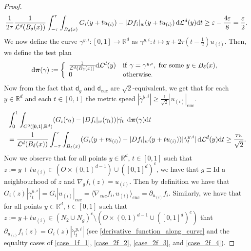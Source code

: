 \documentclass[a4paper,10pt]{article}
\numberwithin{equation}{section}
\newcommand{\R}{\mathbb{R}}
\newcommand{\e}{\varepsilon}
\newcommand{\sfd}{\mathsf d}
\newcommand{\di}{{\rm d}}
\begin{document}
\begin{proof}
    \begin{align}
    \frac{1}{2\tau} \frac{1}{\mathcal{L}^d(B_\delta(x))} \int_{-\tau}^\tau \int_{B_\delta(x)} G_i(y+tu_{(i)})-|Df_i|_w(y+tu_{(i)})\,\di\mathcal{L}^d(y) \di t\geq \e - \frac{4\e}{8} = \frac{\e}{2}.
    \end{align}
    We now define the curve $\gamma^{y, i}:[0,1] \to \R^d$ as $\gamma^{y, i}: t \mapsto y + 2\tau(t- \frac{1}{2})u_{(i)}$. 
    Then, we define the test plan
    \begin{align}
    \di\boldsymbol{\pi}(\gamma):= \left\{ \begin{array}{ll}
           \frac{1}{\mathcal{L}^d(B_\delta(x))}\di\mathcal{L}^d(y) & \mathrm{if}\ \gamma = \gamma^{y, i}, \ \mathrm{for \ some} \ y \in  B_\delta(x), \\
           0\  & \mathrm{otherwise}.
        \end{array}\right.
    \end{align}
    Now from the fact that $\sfd_g$ and $\sfd_{euc}$ are $\sqrt{2}$-equivalent, we get that for each $y \in \R^d$ and each $t \in [0,1]$ the metric speed $|\dot{\gamma}^{y, i}| \geq \frac{1}{\sqrt{2}}|u_{(i)}|_{euc}$.  
\begin{align}\label{evaluation_test_plan_comparison}
&\int_0^1 \int_{C^0([0,1], \R^d)} (G_i(\gamma_t)-|Df_i|_w(\gamma_t))|\dot{\gamma_t}|\,\di \boldsymbol{\pi}(\gamma) \di t\nonumber \\
    &= \frac{1}{\mathcal{L}^d(B_\delta(x))} \int_{-\tau}^\tau \int_{B_\delta(x)} (G_i(y+tu_{(i)})-|Df_i|_w(y+tu_{(i)}))|\dot{\gamma}^{y,i}_t|\,\di\mathcal{L}^d(y) \di t \geq \frac{\tau\e}{\sqrt{2}}.
    \end{align}
Now we observe that for all points $y \in \R^d$, $t \in [0,1]$ such that $z:= y+tu_{(i)} \in (O \times (0,1)^{d-1}) \cup ([0,1]^{d})^c$, we have that $g \equiv \mathrm{Id}$ a neighbourhood of $z$ and $\nabla_g f_i(z) = u_{(i)}$. 
Then by definition we have that $G_i(z) |\dot{\gamma}_t^{y,i}|=G_i|u_{(i)}|_{euc} = \langle \nabla_{euc} f_i, u_{(i)} \rangle_{euc} = \partial_{u_{(i)}}f_i.$
Similarly, we have that for all points $y \in \R^d$, $t \in [0,1]$ such that $z:= y+tu_{(i)} \in (N_2 \cup N_g)^c \setminus ( O \times (0,1)^{d-1} \cup ([0,1]^d)^c)$ that $\partial_{u_{(i)}}f_i(z) = G_i(z)|\dot{\gamma}_t^{y,i}|$ (see \eqref{derivative_function_along_curve} and the equality cases of \eqref{case_1f_1}, \eqref{case_2f_2}, \eqref{case_2f_3}, and \eqref{case_2f_4}).


\end{proof}
\end{document}
